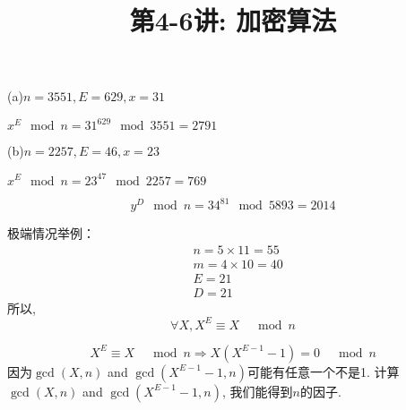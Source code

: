 \documentclass[a4paper, justified]{tufte-handout}
\title{第4-6讲: 加密算法}
\date{\zhtoday} %
\begin{document}
\maketitle
\noplagiarism %
\begin{abstract}
\end{abstract}
\beginrequired

\begin{problem}[TJ 7-7(a,b)]
\end{problem}

\begin{solution}
  (a)$n=3551,E=629,x=31$

  $x^E \mod n=31^{629}\mod 3551 =2791$

  (b)$n=2257, E=46,x=23$

  $x^E \mod n=23^{47}\mod 2257 =769$
\end{solution}

\begin{problem}[TJ 7-9(b)]
\end{problem}

\begin{solution}
  $$y^D \mod n =34^{81} \mod 5893=2014$$
\end{solution}

\begin{problem}[TJ 7-12]
\end{problem}

\begin{solution}
  极端情况举例：
  $$
    \begin{aligned}
       & n=5 \times 11=55 \\
       & m=4 \times 10=40 \\
       & E=21             \\
       & D=21
    \end{aligned}
  $$
  所以,
  $$
    \forall X, X^E \equiv X \quad \bmod n
  $$

  $$
    X^E \equiv X \quad \bmod n \Rightarrow X\left(X^{E-1}-1\right)=0 \quad \bmod n
  $$
  因为$\operatorname{gcd}(X, n)$ and $\operatorname{gcd}\left(X^{E-1}-1, n\right)$可能有任意一个不是1.
  计算$\operatorname{gcd}(X, n)$ and $\operatorname{gcd}\left(X^{E-1}-1, n\right)$, 我们能得到$n$的因子.
\end{solution}
\end{document}
